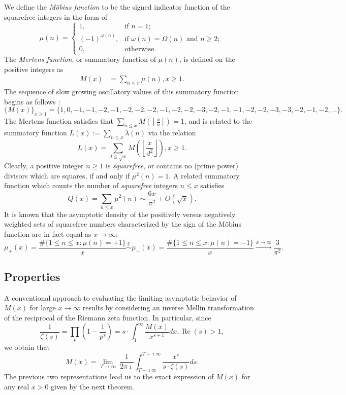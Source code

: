 \documentclass[11pt,reqno,a4letter]{article}
\numberwithin{figure}{section}
\numberwithin{table}{section}
\newcommand{\seqnum}[1]{\href{http://oeis.org/#1}{\color{ProcessBlue}{\underline{#1}}}}
\newcommand{\Floor}[2]{\ensuremath{\left\lfloor \frac{#1}{#2} \right\rfloor}}
\theoremstyle{plain}
\numberwithin{theorem}{section}
\theoremstyle{definition}
\renewcommand{\Re}{\operatorname{Re}}
\begin{document}
We define the \emph{M\"obius function} to be the signed indicator function 
of the squarefree integers in the form of \cite[\seqnum{A008683}]{OEIS} 
\[
\mu(n) = \begin{cases} 
     1, & \text{if $n = 1$; } \\ 
     (-1)^{\omega(n)}, & \text{if $\omega(n) = \Omega(n)$ and $n \geq 2$; } \\ 
     0, & \text{otherwise.} 
     \end{cases} 
\]
The \emph{Mertens function}, or summatory function of $\mu(n)$, is defined on the 
positive integers as 
\begin{align*} 
M(x) & = \sum_{n \leq x} \mu(n), x \geq 1. 
\end{align*} 
The sequence of slow growing oscillatory values of this 
summatory function begins as follows \cite[\seqnum{A002321}]{OEIS}: 
\[
\{M(x)\}_{x \geq 1} = \{1, 0, -1, -1, -2, -1, -2, -2, -2, -1, -2, -2, -3, -2, 
     -1, -1, -2, -2, -3, -3, -2, -1, -2, \ldots\}. 
\] 
The Mertens function satisfies that $\sum_{n \leq x} M\left(\Floor{x}{n}\right) = 1$, and is related 
to the summatory function $L(x) := \sum_{n \leq x} \lambda(n)$ via the relation 
\cite{LEHMAN-1960} 
\[
L(x) = \sum_{d \leq \sqrt{x}} M\left(\Floor{x}{d^2}\right), x \geq 1. 
\]
Clearly, a positive integer $n \geq 1$ is \emph{squarefree}, or contains no (prime power) divisors which are 
squares, if and only if $\mu^2(n) = 1$. 
A related summatory function which counts the 
number of \emph{squarefree} integers $n \leq x$ satisfies 
\cite[\S 18.6]{HARDYWRIGHT} \cite[\seqnum{A013928}]{OEIS} 
\[ 
Q(x) = \sum_{n \leq x} \mu^2(n) \sim \frac{6x}{\pi^2} + O\left(\sqrt{x}\right). 
\] 
It is known that the asymptotic density of the positively versus negatively 
weighted sets of squarefree numbers characterized by the sign of the 
M\"obius function are in fact equal as $x \rightarrow \infty$: 
\[
\mu_{+}(x) = \frac{\#\{1 \leq n \leq x: \mu(n) = +1\}}{x} \overset{\mathbb{E}}{\sim} 
     \mu_{-}(x) = \frac{\#\{1 \leq n \leq x: \mu(n) = -1\}}{x} 
     \xrightarrow{x \rightarrow \infty} \frac{3}{\pi^2}. 
\]

\subsection{Properties} 

A conventional approach to evaluating the limiting asymptotic 
behavior of $M(x)$ for large $x \rightarrow \infty$ results by considering an 
inverse Mellin transformation of the reciprocal of the Riemann zeta function. 
In particular, since 
\[
\frac{1}{\zeta(s)} = \prod_{p} \left(1 - \frac{1}{p^s}\right) = 
     s \cdot \int_1^{\infty} \frac{M(x)}{x^{s+1}} dx, \Re(s) > 1, 
\]
we obtain that 
\[
M(x) = \lim_{T \rightarrow \infty}\ \frac{1}{2\pi\imath} \int_{T-\imath\infty}^{T+\imath\infty} 
     \frac{x^s}{s \cdot \zeta(s)} ds. 
\] 
The previous two representations lead us to the 
exact expression of $M(x)$ for any real $x > 0$ 
given by the next theorem. 
\nocite{TITCHMARSH} 
\end{document}
